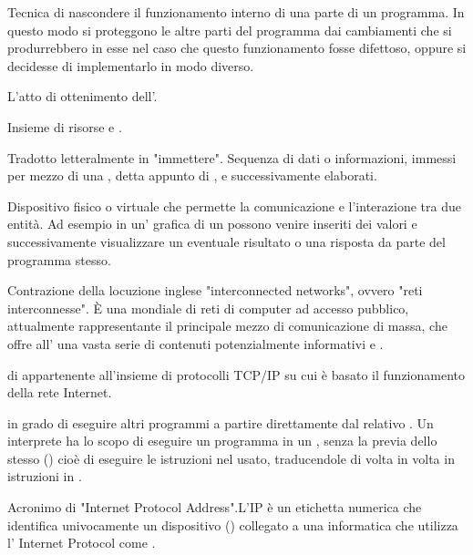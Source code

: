 {Tecnica di nascondere il funzionamento interno di una parte di un programma. In questo modo si proteggono le altre parti del programma dai cambiamenti che si produrrebbero in esse nel caso che questo funzionamento fosse difettoso, oppure si decidesse di implementarlo in modo diverso.}

{L'atto di ottenimento dell'.}

{Insieme di risorse  e .}

{Tradotto letteralmente in "immettere". Sequenza di dati o informazioni, immessi per mezzo di una , detta appunto di , e successivamente elaborati.}

{Dispositivo fisico o virtuale che permette la comunicazione e l'interazione tra due entità. Ad esempio in un' grafica di un  possono venire inseriti dei valori e successivamente visualizzare un eventuale risultato o una risposta da parte del programma stesso.}

{Contrazione della locuzione inglese "interconnected networks", ovvero "reti interconnesse".
\`{E} una  mondiale di reti di computer ad accesso pubblico, attualmente rappresentante il principale mezzo di comunicazione di massa, che offre all' una vasta serie di contenuti potenzialmente informativi e .}

{ di  appartenente all'insieme di protocolli  TCP/IP su cui è basato il funzionamento della rete Internet.}

{ in grado di eseguire altri programmi a partire direttamente dal relativo . Un interprete ha lo scopo di eseguire un programma in un , senza la previa  dello stesso () cioè di eseguire le istruzioni nel  usato, traducendole di volta in volta in istruzioni in .}

{Acronimo di "Internet Protocol Address".L'IP è un etichetta numerica che identifica univocamente un dispositivo () collegato a una  informatica che utilizza l' Internet Protocol come .}

